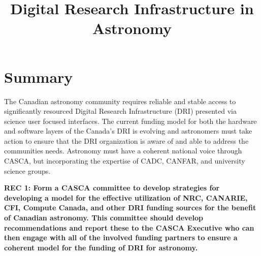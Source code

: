 \documentclass[11pt]{article}
\begin{document}

%
\setlength{\bibsep}{0.0pt}
\author{}
\title{Digital Research Infrastructure in Astronomy}
\maketitle
\section{Summary}

The Canadian astronomy community requires reliable and stable access to significantly resourced Digital Research Infrastructure (DRI) presented via science user focused interfaces.  The current funding model for both the hardware and software layers of the Canada's DRI is evolving and astronomers must take action to ensure that the DRI organization is aware of and able to address the communities needs.   Astronomy must have a coherent national voice through CASCA, but incorporating the expertise of CADC, CANFAR, and university science groups.

{\bf REC 1: Form a CASCA committee to develop strategies for developing a model for the effective utilization of NRC, CANARIE, CFI, Compute Canada, and other DRI funding sources for the benefit of Canadian astronomy. This committee should develop recommendations and report these to the CASCA Executive who can then engage with all of the involved funding partners to ensure a coherent model for the funding of DRI for astronomy.}
\end{document}

